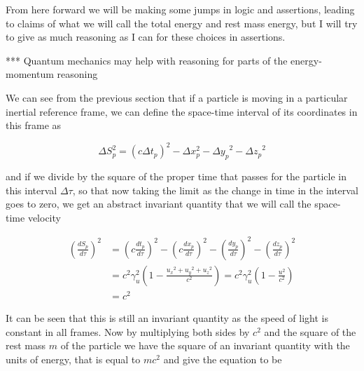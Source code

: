 From here forward we will be making some jumps in logic and assertions, leading to claims of what we will call the total energy and rest mass energy, but I will try to give as much reasoning as I can for these choices in assertions.

*** Quantum mechanics may help with reasoning for parts of the energy-momentum reasoning


We can see from the previous section that if a particle is moving in a particular inertial reference frame, we can define the space-time interval of its coordinates in this frame as

\begin{equation}
	\Delta S_p^2 = (c\Delta {t}_p)^2-\Delta x_p^2-{\Delta y_p}^2-{\Delta z_p}^2
\end{equation}

and if we divide by the square of the proper time that passes for the particle in this interval ${\Delta\tau}$, so that now taking the limit as the change in time in the interval goes to zero, we get an abstract invariant quantity that we will call the space-time velocity

\begin{equation}
	\begin{aligned}
		\left(\frac{dS_p}{d\tau}\right)^2 & = \left(c\frac{{{dt}_{p}}}{d\tau}\right)^2-\left(c\frac{dx_p}{d\tau}\right)^2-\left(\frac{dy_p}{d\tau}\right)^2-\left(\frac{dz_p}{d\tau}\right)^2 \\
		                                  & = {c}^2\gamma_{u}^2 \left( 1-\frac{{{u}_{x}}^2 + {{u}_{y}}^2 + {{u}_{z}}^2}{{c}^2} \right) = {c}^2\gamma_{u}^2 \left( 1-\frac{u^2}{{c}^2} \right) \\
		                                  & = {c}^2
	\end{aligned}
\end{equation}

It can be seen that this is still an invariant quantity as the speed of light is constant in all frames.
Now by multiplying both sides by ${c}^2$ and the square of the rest mass ${m}$ of the particle we have the square of an invariant quantity with the units of energy, that is equal to ${m}{c}^2$ and give the equation to be

